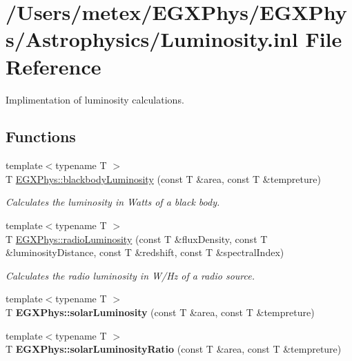 \hypertarget{_luminosity_8inl}{}\section{/\+Users/metex/\+E\+G\+X\+Phys/\+E\+G\+X\+Phys/\+Astrophysics/\+Luminosity.inl File Reference}
\label{_luminosity_8inl}


Implimentation of luminosity calculations.  


\subsection*{Functions}
\begin{DoxyCompactItemize}
\item 
{\footnotesize template$<$typename T $>$ }\\T \hyperlink{group___astrophysics_ga909f82edfaed449b44e94788b642ebb8}{E\+G\+X\+Phys\+::blackbody\+Luminosity} (const T \&area, const T \&tempreture)
\begin{DoxyCompactList}\small\item\em Calculates the luminosity in Watts of a black body. \end{DoxyCompactList}\item 
{\footnotesize template$<$typename T $>$ }\\T \hyperlink{group___astrophysics_ga6d6865b2aac1bc7c7f06b7c4ac2444e4}{E\+G\+X\+Phys\+::radio\+Luminosity} (const T \&flux\+Density, const T \&luminosity\+Distance, const T \&redshift, const T \&spectral\+Index)
\begin{DoxyCompactList}\small\item\em Calculates the radio luminosity in W/\+Hz of a radio source. \end{DoxyCompactList}\item 
\mbox{\label{_luminosity_8inl_ade3d05c9dcd810cb5290375d11587b6a}} 
{\footnotesize template$<$typename T $>$ }\\T {\bfseries E\+G\+X\+Phys\+::solar\+Luminosity} (const T \&area, const T \&tempreture)
\item 
\mbox{\label{_luminosity_8inl_ac5e66686d7910587e3636b7984d466e9}} 
{\footnotesize template$<$typename T $>$ }\\T {\bfseries E\+G\+X\+Phys\+::solar\+Luminosity\+Ratio} (const T \&area, const T \&tempreture)
\end{DoxyCompactItemize}


